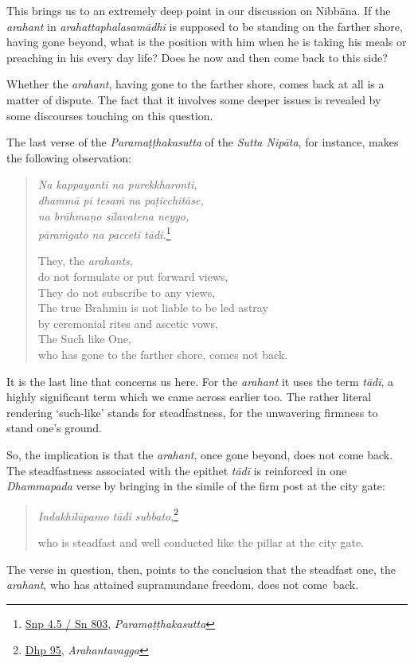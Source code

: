 This brings us to an extremely deep point in our discussion on Nibbāna. If the \emph{arahant} in \emph{arahattaphalasamādhi} is supposed to be standing on the farther shore, having gone beyond, what is the position with him when he is taking his meals or preaching in his every day life? Does he now and then come back to this side?

Whether the \emph{arahant}, having gone to the farther shore, comes back at all is a matter of dispute. The fact that it involves some deeper issues is revealed by some discourses touching on this question.

The last verse of the \emph{Paramaṭṭhakasutta} of the \emph{Sutta Nipāta}, for instance, makes the following observation:

\begin{quote}
\emph{Na kappayanti na purekkharonti,}\\
\emph{dhammā pi tesaṁ na paṭicchitāse,}\\
\emph{na brāhmaṇo sīlavatena neyyo,}\\
\emph{pāraṁgato na pacceti tādi.}\footnote{\href{https://suttacentral.net/snp4.5/pli/ms}{Snp 4.5 / Sn 803}, \emph{Paramaṭṭhakasutta}}

They, the \emph{arahants},\\
\vin do not formulate or put forward views,\\
They do not subscribe to any views,\\
The true Brahmin is not liable to be led astray\\
\vin by ceremonial rites and ascetic vows,\\
The Such like One,\\
\vin who has gone to the farther shore, comes not back.
\end{quote}

It is the last line that concerns us here. For the \emph{arahant} it uses the term \emph{tādī}, a highly significant term which we came across earlier too. The rather literal rendering `such-like' stands for steadfastness, for the unwavering firmness to stand one's ground.

So, the implication is that the \emph{arahant}, once gone beyond, does not come back. The steadfastness associated with the epithet \emph{tādī} is reinforced in one \emph{Dhammapada} verse by bringing in the simile of the firm post at the city gate:

\begin{quote}
\emph{Indakhīlūpamo tādi subbato},\footnote{\href{https://suttacentral.net/dhp90-99/pli/ms}{Dhp 95}, \emph{Arahantavagga}}

who is steadfast and well conducted like the pillar at the city gate.
\end{quote}

The verse in question, then, points to the conclusion that the steadfast one, the \emph{arahant}, who has attained supramundane freedom, does not come~back.

